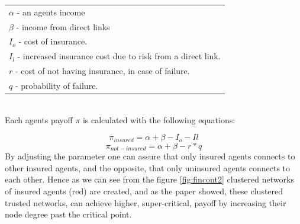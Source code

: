 \begin{tabular}{|l|}
 \hline
  $\alpha$ - an agents income\\
  $\beta$ - income from direct links \\
  $I_{o}$ - cost of insurance. \\
  $I_{l}$ - increased insurance cost due to risk from a direct link.\\
  $r$ - cost of not having insurance, in case of failure.\\
  $q$ - probability of failure. \\
  \hline
\end{tabular} \\

Each agents payoff $ \pi$ is calculated with the following equations: 

\begin{equation}
  \pi_{insured} = \alpha + \beta - I_{o} - I{l}
 \label{eq:payoffinsured}
\end{equation} 
\begin{equation}
  \pi_{not-insured} = \alpha + \beta -r*q
 \label{eq:payoffnotinsured}
\end{equation} 
By adjusting the parameter one can assure that only insured agents connects to other insured agents, and the opposite,
that only uninsured agents connects to each other. Hence as we can see from the figure \ref{fig:fincont2} clustered
networks of insured agents (red) are created, and  as the paper \cite{contagion} showed, these clustered trusted
networks, can achieve higher, super-critical, payoff by increasing their node degree past the critical point.

